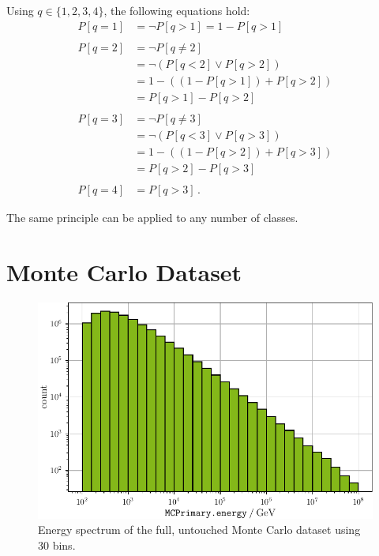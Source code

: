 Using $q \in \{1, 2, 3, 4\}$,
the following equations hold:
\begin{align*}
  P[q=1] &= \neg P[q>1] = 1 - P[q>1] \\
  \\
  P[q=2] &= \neg P[q≠2] \\
  &= \neg(P[q<2] \lor P[q>2]) \\
  &= 1 - ((1 - P[q>1]) + P[q>2]) \\
  &= P[q>1] - P[q>2] \\
  \\
  P[q=3] &= \neg P[q≠3] \\
  &= \neg(P[q<3] \lor P[q>3]) \\
  &= 1 - ((1 - P[q>2]) + P[q>3]) \\
  &= P[q>2] - P[q>3] \\
  \\
  P[q=4] &= P[q>3] \, .
\end{align*}

The same principle can be applied to any number of classes.


\clearpage
\section{Monte Carlo Dataset}
\begin{figure}
  \centering
  \includegraphics[scale=1]{content/plots/dataset:raw:histogram_full.pdf}
  \caption{Energy spectrum of the full, untouched Monte Carlo dataset using 30 bins.}
  \label{fig:dataset:raw:histogram}
\end{figure}


\clearpage
